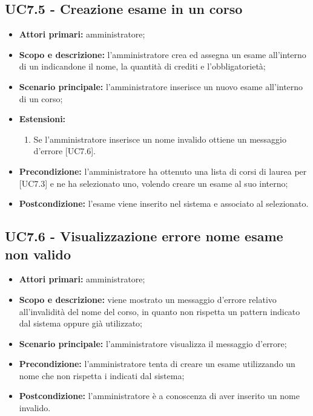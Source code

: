 \documentclass[AnalisiDeiRequisiti.tex]{subfiles}
\begin{document}
\subsection{UC7.5 - Creazione esame in un corso}
\begin{itemize}
	\item \textbf{Attori primari:} amministratore;
	\item \textbf{Scopo e descrizione:} l'amministratore crea ed assegna un esame all'interno di un  indicandone il nome, la quantità di crediti e l'obbligatorietà;
	\item \textbf{Scenario principale:} l'amministratore inserisce un nuovo esame all'interno di un corso;
	\item \textbf{Estensioni:}
	\begin{enumerate}
		\item Se l'amministratore inserisce un nome invalido ottiene un messaggio d'errore [UC7.6].
	\end{enumerate}
	\item \textbf{Precondizione:} l'amministratore ha ottenuto una lista di corsi di laurea per  [UC7.3] e ne ha selezionato uno, volendo creare un esame al suo interno; 
	\item \textbf{Postcondizione:} l'esame viene inserito nel sistema e associato al  selezionato.
\end{itemize}
\subsection{UC7.6 - Visualizzazione errore nome esame non valido}
\begin{itemize}
	\item \textbf{Attori primari:} amministratore;
	\item \textbf{Scopo e descrizione:} viene mostrato un messaggio d'errore relativo all'invalidità del nome del corso, in quanto non rispetta un pattern indicato dal sistema oppure già utilizzato;
	\item \textbf{Scenario principale:} l'amministratore visualizza il messaggio d'errore;
	\item \textbf{Precondizione:} l'amministratore tenta di creare un esame utilizzando un nome che non rispetta i  indicati dal sistema; 
	\item \textbf{Postcondizione:} l'amministratore è a conoscenza di aver inserito un nome invalido.
\end{itemize}
\end{document}

